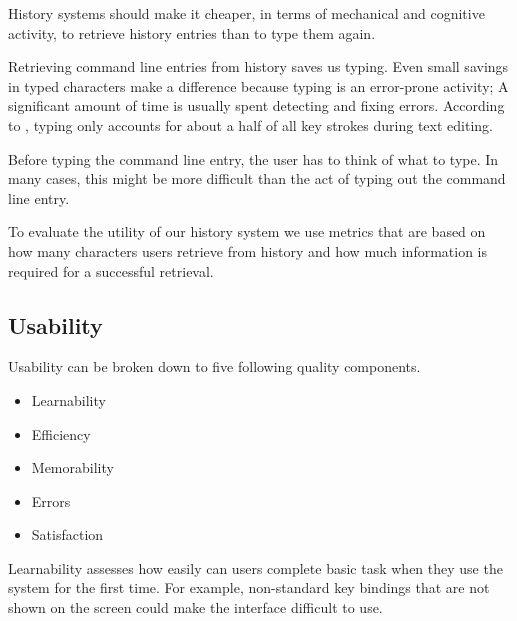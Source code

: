 History systems should make it cheaper, in terms of mechanical and cognitive activity, to retrieve history entries than to type them again.\cite{greenberg1993computer}

Retrieving command line entries from history saves us typing. Even small savings in typed characters make a difference because typing is an error-prone activity; A significant amount of time is usually spent detecting and fixing errors. According to \cite{whiteside1982people}, typing only accounts for about a half of all key strokes during text editing. 


Before typing the command line entry, the user has to think of what to type. In many cases, this might be more difficult than the act of typing out the command line entry.   


To evaluate the utility of our history system we use metrics that are based on how many characters users retrieve from history and how much information is required for a successful retrieval.

\subsection{Usability}

Usability can be broken down to five following quality components.\cite{nielsen2012usability}



\begin{itemize}
    \item Learnability
    \item Efficiency
    \item Memorability
    \item Errors
    \item Satisfaction
\end{itemize}

Learnability assesses how easily can users complete basic task when they use the system for the first time. For example, non-standard key bindings that are not shown on the screen could make the interface difficult to use.


